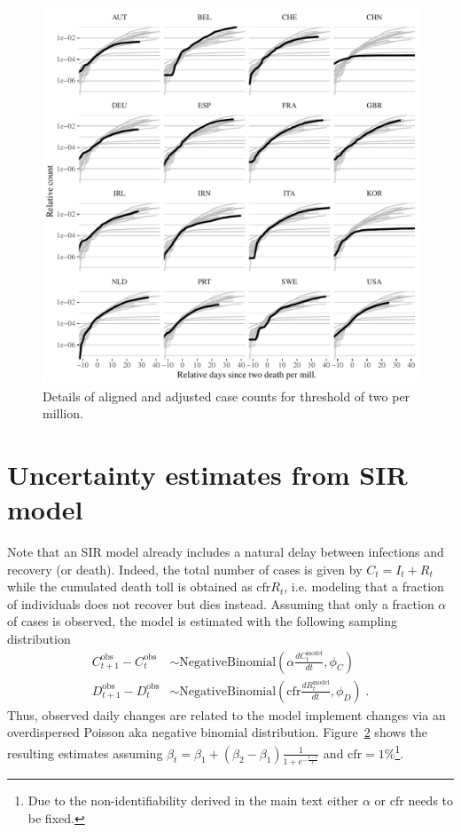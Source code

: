 \documentclass[fullpage,a4paper]{article}
\newcommand{\fig}[1]{Figure~\ref{fig:#1}}
\begin{document}
\begin{figure}
  \includegraphics[width=1\textwidth]{../figs/ecdc_nyt_case_est_twopermill.pdf}
  \caption{\label{fig:align_estcase_nyt} Details of aligned and
    adjusted case counts for threshold of two per million.}
\end{figure}

\section{Uncertainty estimates from SIR model}

Note that an SIR model already includes a natural delay between
infections and recovery (or death). Indeed, the total number of cases
is given by $C_t = I_t + R_t$ while the cumulated death toll is
obtained as $\mathrm{cfr} R_t$, i.e. modeling that a fraction of
individuals does not recover but dies instead. Assuming that only a
fraction $\alpha$ of cases is observed, the model is estimated with
the following sampling distribution
\begin{align*}
  C^{\mathrm{obs}}_{t+1} - C^{\mathrm{obs}}_t &\sim \mathrm{NegativeBinomial}\left(\alpha \frac{dC^{\mathrm{model}}_t}{dt}, \phi_C \right) \\
  D^{\mathrm{obs}}_{t+1} - D^{\mathrm{obs}}_t &\sim \mathrm{NegativeBinomial}\left(\mathrm{cfr} \frac{dR^{\mathrm{model}}_t}{dt}, \phi_D \right) \; .
\end{align*}
Thus, observed daily changes are related to the model implement
changes via an overdispersed Poisson aka negative binomial
distribution. \fig{sir_fit} shows the resulting estimates assuming
$\beta_t = \beta_1 + (\beta_2 - \beta_1) \frac{1}{1 + e^{- \frac{t -
      \tau}{T} }}$ and $\mathrm{cfr} = 1\%$\footnote{Due to the
  non-identifiability derived in the main text either $\alpha$ or
  $\mathrm{cfr}$ needs to be fixed.}.

\begin{figure}
  
  \caption{\label{fig:sir_fit}}
  
\end{figure}
\end{document}
